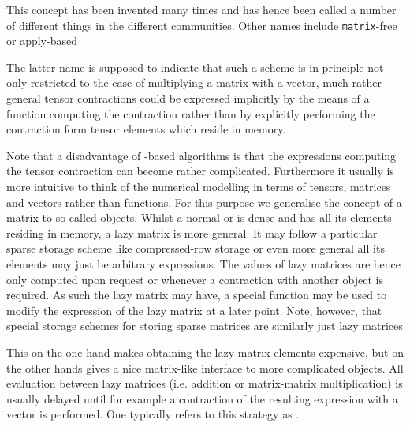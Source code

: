This concept has been invented many times
and has hence been called a number of different things
in the different communities.
Other names include \texttt{matrix}-free
or apply-based


The latter name is supposed to indicate that such a scheme is in principle
not only restricted to the case of multiplying a matrix with a vector,
much rather general tensor contractions could be expressed implicitly
by the means of a function computing the contraction rather than
by explicitly performing the contraction form tensor elements
which reside in memory.

Note that a disadvantage of \contraction-based algorithms is that the expressions
computing the tensor contraction can become rather complicated.
Furthermore it usually is more intuitive to think of the
numerical modelling in terms of tensors, matrices and vectors
rather than \contraction functions.
For this purpose we generalise the concept of a matrix
to so-called  objects.
Whilst a normal or  is dense and has all its elements
residing in memory,
a lazy matrix is more general.
It may follow a particular sparse storage scheme
like compressed-row storage
or even more general all its elements may just be arbitrary expressions.
The values of lazy matrices are hence only computed upon request
or whenever a contraction with another object is required.
As such the lazy matrix may have, \ie a special \update function
may be used to modify the expression of the lazy matrix
at a later point.
Note, however, that special storage schemes for storing
sparse matrices are similarly just lazy matrices 

This on the one hand makes obtaining the lazy matrix elements
expensive, but on the other hands gives a nice matrix-like
interface to more complicated objects.
All evaluation between lazy matrices
(i.e. addition or matrix-matrix multiplication)
is usually delayed until for example a contraction of the resulting
expression with a vector is performed.
One typically refers to this strategy as .

